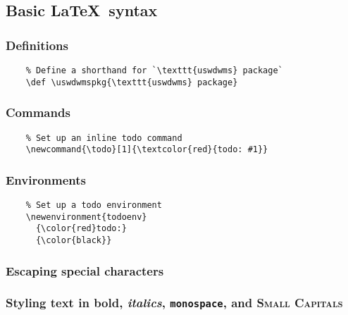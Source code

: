 \subsection{Basic \LaTeX\ syntax}
\subsubsection*{Definitions}
\begin{listing}[H]
  \captionsetup{skip=\skiplistingcaptionlen}
  \begin{verbatim}
    % Define a shorthand for `\texttt{uswdwms} package`
    \def \uswdwmspkg{\texttt{uswdwms} package}
  \end{verbatim}
  \caption{\texttt{\textbackslash def} command examples}
  \label{example:lst:def}
\end{listing}
\subsubsection*{Commands}
\begin{listing}[H]
  \captionsetup{skip=\skiplistingcaptionlen}
  \begin{verbatim}
    % Set up an inline todo command
    \newcommand{\todo}[1]{\textcolor{red}{todo: #1}}
  \end{verbatim}
  \caption{\texttt{\textbackslash newcommand} command example}
  \label{example:lst:newcommand}
\end{listing}
\subsubsection*{Environments}
\begin{listing}[H]
  \captionsetup{skip=\skiplistingcaptionlen}
  \begin{verbatim}
    % Set up a todo environment
    \newenvironment{todoenv}
      {\color{red}todo:}
      {\color{black}}
  \end{verbatim}
  \caption{\texttt{\textbackslash newenvironment} command example}
  \label{example:lst:newenvironment}
\end{listing}
\subsubsection*{Escaping special characters}

\subsubsection*{Styling text in \textbf{bold}, \textit{italics}, \texttt{monospace}, and \textsc{Small Capitals}}

